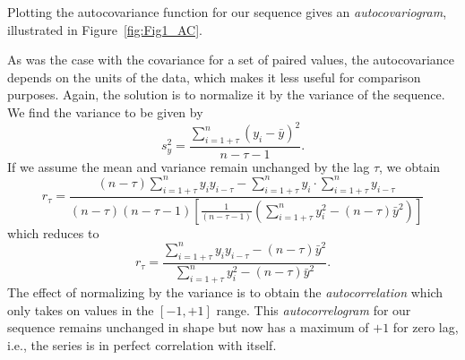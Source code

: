 Plotting the autocovariance function for our sequence gives an \emph{autocovariogram},
illustrated in Figure~\ref{fig:Fig1_AC}.


As was the case with the covariance for a set of paired values, the autocovariance depends on the 
units of the data, which makes it less useful for comparison purposes.  Again, the solution is to 
normalize it by the variance of the sequence. We find the variance to be given by
\begin{equation}
s^2_{y} = \frac{\displaystyle \sum^n_{i=1+\tau} (y_i - \bar{y})^2}{n - \tau - 1}.
\end{equation}
If we assume the mean and variance remain unchanged by the lag $\tau$, we obtain
\begin{equation}
r_\tau = \frac{(n-\tau ) \displaystyle \sum^n_{i=1+\tau} y_i y_{i-\tau} - \sum^n_{i=1+\tau} y_i \cdot \displaystyle \sum^n_{i=1+\tau} 
y_{i -\tau} }
{(n-\tau )(n-\tau - 1) \left[ \frac{1}{(n - \tau - 1)} \left ( \displaystyle \sum^n_{i=1+\tau} y^2_i - (n - \tau ) \bar{y}^2 \right) \right ]}
\end{equation}
which reduces to
\begin{equation}
r_\tau = \frac{ \displaystyle \sum^n_{i=1+\tau}y_i y_{i-\tau} - (n-\tau ) \bar{y}^2}
{ \displaystyle\sum^n_{i=1+\tau } y^2 _i - (n - \tau )\bar{y}^2}.
\end{equation}
The effect of normalizing by the variance is to obtain the \emph{autocorrelation} which only takes on 
values in the $[-1,+1]$ range.  This \emph{autocorrelogram} for our sequence remains unchanged in shape 
but now has a maximum of $+1$ for zero lag, i.e., the series is in perfect correlation with itself.

